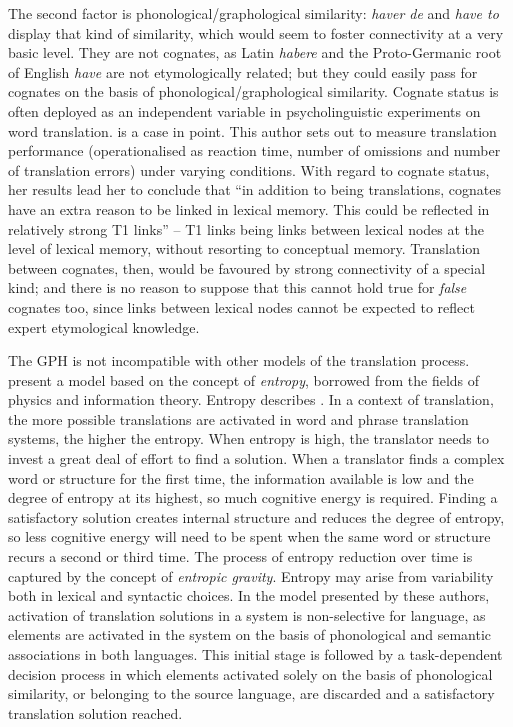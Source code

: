 \documentclass[output=paper,english,spanish,german,english]{langsci/langscibook}
\begin{document}
The second factor is phonological/graphological similarity: \textit{haver de }and \textit{have to }display that kind of similarity, which would seem to foster connectivity at a very basic level. They are not cognates, as Latin \textit{habere} and the Proto-Germanic root of English \textit{have} are not etymologically related; but they could easily pass for cognates on the basis of phonological/graphological similarity. Cognate status is often deployed as an independent variable in psycholinguistic experiments on word translation. \citet{degroot92ep} is a case in point. This author sets out to measure translation performance (operationalised as reaction time, number of omissions and number of translation errors) under varying conditions. With regard to cognate status, her results lead her to conclude that \enquote{in addition to being translations, cognates have an extra reason to be linked in lexical memory. This could be reflected in relatively strong T1 links} -- T1 links being links between lexical nodes at the level of lexical memory, without resorting to conceptual memory. Translation between cognates, then, would be favoured by strong connectivity of a special kind; and there is no reason to suppose that this cannot hold true for \textit{false} cognates too, since links between lexical nodes cannot be expected to reflect expert etymological knowledge.

The GPH is not incompatible with other models of the translation process. \citet{caretal19} present a model based on the concept of \textit{entropy}, borrowed from the fields of physics and information theory. Entropy describes . In a context of translation, the more possible translations are activated in word and phrase translation systems, the higher the entropy. When entropy is high, the translator needs to invest a great deal of effort to find a solution. When a translator finds a complex word or structure for the first time, the information available is low and the degree of entropy at its highest, so much cognitive energy is required. Finding a satisfactory solution creates internal structure and reduces the degree of entropy, so less cognitive energy will need to be spent when the same word or structure recurs a second or third time. The process of entropy reduction over time is captured by the concept of \textit{entropic gravity}. Entropy may arise from variability both in lexical and syntactic choices. In the model presented by these authors, activation of translation solutions in a system is non-selective for language, as elements are activated in the system on the basis of phonological and semantic associations in both languages. This initial stage is followed by a task-dependent decision process in which elements activated solely on the basis of phonological similarity, or belonging to the source language, are discarded and a satisfactory translation solution reached.
\end{document}
